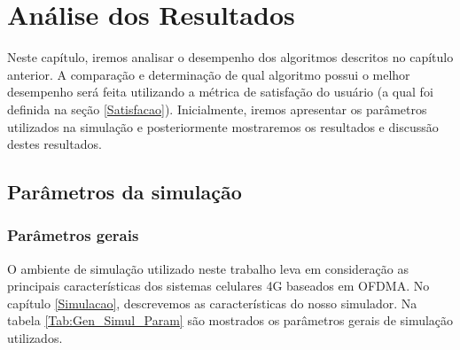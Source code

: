 

\chapter[Análise dos Resultados]{Análise dos Resultados}
\label{resultados}
Neste capítulo, iremos analisar o desempenho dos algoritmos descritos no capítulo anterior. A comparação e determinação de qual algoritmo possui o melhor desempenho será feita utilizando a métrica de satisfação do usuário (a qual foi definida na seção \ref{Satisfacao}). Inicialmente, iremos apresentar os parâmetros utilizados na simulação e posteriormente mostraremos os resultados e discussão destes resultados.

\section{Parâmetros da simulação}

\subsection{Parâmetros gerais}

O ambiente de simulação utilizado neste trabalho leva em consideração as principais características dos sistemas celulares 4G baseados em OFDMA. No capítulo \ref{Simulacao}, descrevemos as características do nosso simulador. Na tabela \ref{Tab:Gen_Simul_Param} são mostrados os parâmetros gerais de simulação utilizados.

